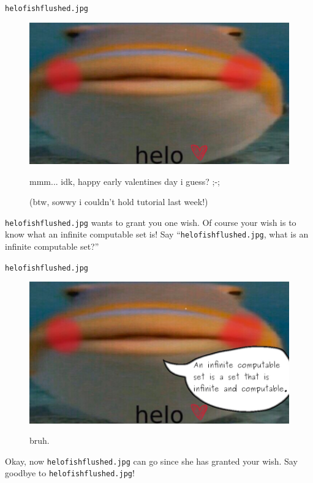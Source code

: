 \documentclass{beamer}
\begin{document}
\begin{frame}{\texttt{helo\textunderscore fish\textunderscore flushed.jpg}}

\begin{figure}[h]
\centering
\includegraphics[scale=0.3]{img/helo_fish_flushed.jpg}

mmm... idk, happy early valentines day i guess? ;-;

(btw, sowwy i couldn't hold tutorial last week!)
\end{figure}

\texttt{helo\textunderscore fish\textunderscore flushed.jpg} wants to grant you one wish. Of course your wish is to know what an infinite computable set is! Say ``\texttt{helo\textunderscore fish\textunderscore flushed.jpg}, what is an infinite computable set?''

\end{frame}

\begin{frame}{\texttt{helo\textunderscore fish\textunderscore flushed.jpg}}

\begin{figure}[h]
\centering
\includegraphics[scale=0.3]{img/helo_fish_ic.jpg}

bruh.
\end{figure}

Okay, now \texttt{helo\textunderscore fish\textunderscore flushed.jpg} can go since she has granted your wish. Say goodbye to \texttt{helo\textunderscore fish\textunderscore flushed.jpg}!
\end{frame}
\end{document}
